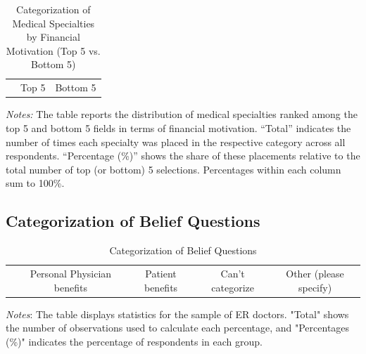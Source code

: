 \documentclass[11pt]{article}
\theoremstyle{definition}
\begin{document}
\begin{table}[H]
    \centering
    \caption{Categorization of Medical Specialties by Financial Motivation (Top 5 vs. Bottom 5)}
    \begin{adjustbox}{width=0.55\linewidth} 
    \begin{tabular}{lcccc}\toprule & \multicolumn{2}{c}{Top 5} & \multicolumn{2}{c}{Bottom 5} \\ \cmidrule(lr){2-3} \cmidrule(lr){4-5} 
    
    \end{tabular}
    \end{adjustbox}
    \label{tab:med_field_cat_finmov}
          {\parbox{1\linewidth}{           %
		\scriptsize{{{ \textit{Notes:} The table reports the distribution of medical specialties ranked among the top 5 and bottom 5 fields in terms of financial motivation. “Total” indicates the number of times each specialty was placed in the respective category across all respondents. “Percentage (\%)” shows the share of these placements relative to the total number of top (or bottom) 5 selections. Percentages within each column sum to 100\%.}}}}}
\end{table}


\subsection{Categorization of Belief Questions} 

\begin{table}[H]
    \centering
    \caption{Categorization of Belief Questions}
        \begin{adjustbox}{width=0.95\linewidth} 
    \begin{tabular}{lcccccccc}\toprule & \multicolumn{2}{c}{Personal Physician benefits} & \multicolumn{2}{c}{Patient benefits} & \multicolumn{2}{c}{Can't categorize} & \multicolumn{2}{c}{Other (please specify)} \\ \cmidrule(lr){2-3} \cmidrule(lr){4-5} \cmidrule(lr){6-7} \cmidrule(lr){8-9} 

    \end{tabular}
\end{adjustbox}
     \parbox{\linewidth}{
        	\vspace{.2cm}
        		\scriptsize{\scriptsize{{\emph{Notes}: The table displays statistics for the sample of ER doctors. "Total" shows the number of observations used to calculate each percentage, and "Percentages (\%)" indicates the percentage of respondents in each group.}}}}
    \label{tab:ai_table}
\end{table}
\end{document}
